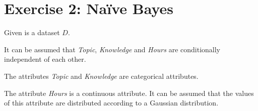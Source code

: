 \documentclass[
english,
smallborders
]{i6prcsht}
\begin{document}
\newpage

\section*{Exercise 2: Naïve Bayes}

\begin{minipage}{.375\textwidth}
	Given is a dataset $D$.

	\vspace*{0.5cm}

	It can be assumed that \textit{Topic}, \textit{Knowledge} and \textit{Hours} are conditionally independent of each other.

	\vspace*{0.5cm}

	The attributes \textit{Topic} and \textit{Knowledge} are categorical attributes.

	\vspace*{0.1cm}

	The attribute \textit{Hours} is a continuous attribute. It can be assumed that the values of this attribute are distributed according to a Gaussian distribution.
\end{minipage}
\begin{minipage}{.625\textwidth}
	\begin{flushright}
	\end{flushright}
\end{minipage}
\end{document}
